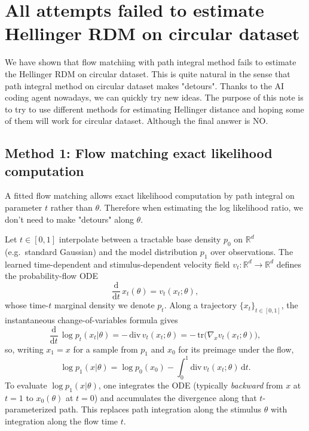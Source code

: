 \section{All attempts failed to estimate Hellinger RDM on circular dataset}

We have shown that flow matchiing with path integral method fails to estimate the Hellinger RDM on circular dataset. This is quite natural in the sense that path integral method on circular dataset makes "detours". Thanks to the AI coding agent nowadays, we can quickly try new ideas. The purpose of this note is to try to use different methods for estimating Hellinger distance and hoping some of them will work for circular dataset. Although the final answer is NO.

\subsection{Method 1: Flow matching exact likelihood computation}
A fitted flow matching allows exact likelihood computation by path integral on parameter $t$ rather than $\theta$. Therefore when estimating the log likelihood ratio, we don't need to make "detours" along $\theta$.

Let $t\in[0,1]$ interpolate between a tractable base density $p_0$ on $\mathbb{R}^d$ (e.g.\ standard Gaussian) and the model distribution $p_1$ over observations.
The learned time-dependent and stimulus-dependent velocity field $v_t:\mathbb{R}^d\to\mathbb{R}^d$ defines the probability-flow ODE
\begin{equation}
  \frac{\mathrm{d}}{\mathrm{d}t}\, x_t(\theta) = v_t(x_t; \theta),
\end{equation}
whose time-$t$ marginal density we denote $p_t$.
Along a trajectory $\{x_t\}_{t\in[0,1]}$, the instantaneous change-of-variables formula gives
\begin{equation}
  \frac{\mathrm{d}}{\mathrm{d}t}\, \log p_t(x_t | \theta)
  = -\,\mathrm{div}\, v_t(x_t; \theta)
  = -\,\mathrm{tr}\!\bigl(\nabla_x v_t(x_t; \theta)\bigr),
\end{equation}
so, writing $x_1=x$ for a sample from $p_1$ and $x_0$ for its preimage under the flow,
\begin{equation}
  \log p_1(x | \theta)
  = \log p_0(x_0)
    - \int_0^1 \mathrm{div}\, v_t(x_t; \theta)\,\mathrm{d}t.
\end{equation}
To evaluate $\log p_1(x | \theta)$, one integrates the ODE (typically \emph{backward} from $x$ at $t=1$ to $x_0(\theta)$ at $t=0$) and accumulates the divergence along that $t$-parameterized path.
This replaces path integration along the stimulus $\theta$ with integration along the flow time $t$.

